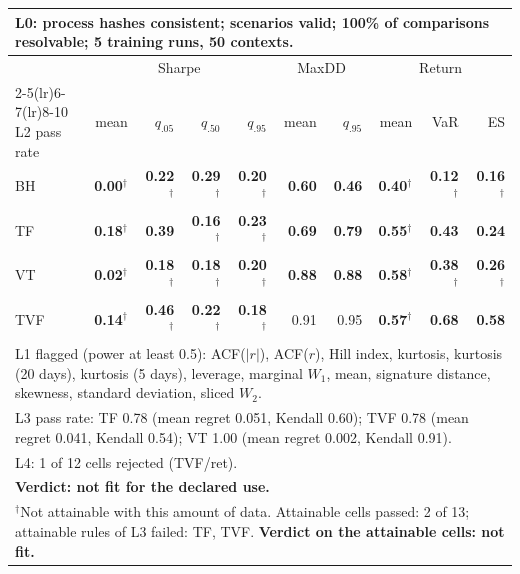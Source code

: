 \begin{tabular}{lrrrrrrrrr}
\toprule
\multicolumn{10}{p{13.5cm}}{L0: process hashes consistent; scenarios valid; 100\% of comparisons resolvable; 5 training runs, 50 contexts.} \\
\midrule
 & \multicolumn{4}{c}{Sharpe} & \multicolumn{2}{c}{MaxDD} & \multicolumn{3}{c}{Return} \\
\cmidrule(lr){2-5}\cmidrule(lr){6-7}\cmidrule(lr){8-10}
L2 pass rate & mean & $q_{.05}$ & $q_{.50}$ & $q_{.95}$ & mean & $q_{.95}$ & mean & VaR & ES \\
\midrule
BH & \textbf{0.00}$^{\dagger}$ & \textbf{0.22}$^{\dagger}$ & \textbf{0.29}$^{\dagger}$ & \textbf{0.20}$^{\dagger}$ & \textbf{0.60} & \textbf{0.46} & \textbf{0.40}$^{\dagger}$ & \textbf{0.12}$^{\dagger}$ & \textbf{0.16}$^{\dagger}$ \\
TF & \textbf{0.18}$^{\dagger}$ & \textbf{0.39} & \textbf{0.16}$^{\dagger}$ & \textbf{0.23}$^{\dagger}$ & \textbf{0.69} & \textbf{0.79} & \textbf{0.55}$^{\dagger}$ & \textbf{0.43} & \textbf{0.24} \\
VT & \textbf{0.02}$^{\dagger}$ & \textbf{0.18}$^{\dagger}$ & \textbf{0.18}$^{\dagger}$ & \textbf{0.20}$^{\dagger}$ & \textbf{0.88} & \textbf{0.88} & \textbf{0.58}$^{\dagger}$ & \textbf{0.38}$^{\dagger}$ & \textbf{0.26}$^{\dagger}$ \\
TVF & \textbf{0.14}$^{\dagger}$ & \textbf{0.46}$^{\dagger}$ & \textbf{0.22}$^{\dagger}$ & \textbf{0.18}$^{\dagger}$ & 0.91 & 0.95 & \textbf{0.57}$^{\dagger}$ & \textbf{0.68} & \textbf{0.58} \\
\midrule
\multicolumn{10}{p{13.5cm}}{L1 flagged (power at least 0.5): ACF($|r|$), ACF($r$), Hill index, kurtosis, kurtosis (20 days), kurtosis (5 days), leverage, marginal $W_1$, mean, signature distance, skewness, standard deviation, sliced $W_2$.} \\
\multicolumn{10}{p{13.5cm}}{L3 pass rate: TF 0.78 (mean regret 0.051, Kendall 0.60); TVF 0.78 (mean regret 0.041, Kendall 0.54); VT 1.00 (mean regret 0.002, Kendall 0.91).} \\
\multicolumn{10}{p{13.5cm}}{L4: 1 of 12 cells rejected (TVF/ret).} \\
\multicolumn{10}{p{13.5cm}}{\textbf{Verdict: not fit for the declared use.}} \\
\multicolumn{10}{p{13.5cm}}{$^{\dagger}$Not attainable with this amount of data. Attainable cells passed: 2 of 13; attainable rules of L3 failed: TF, TVF. \textbf{Verdict on the attainable cells: not fit.}} \\
\bottomrule
\end{tabular}
